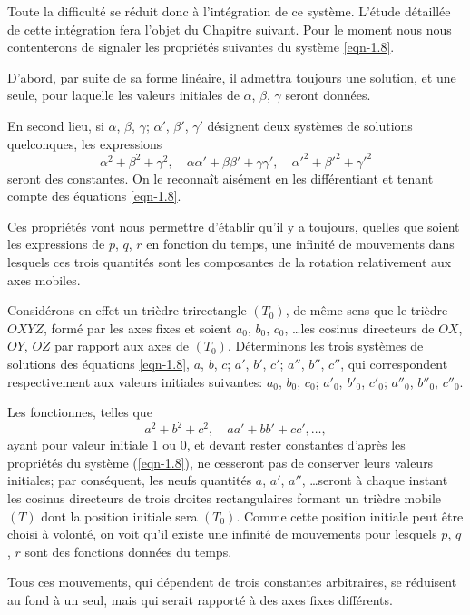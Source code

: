 Toute la difficulté se réduit donc à l'intégration de ce système. L'étude détaillée de cette intégration fera l'objet 
du Chapitre suivant. Pour le moment nous nous contenterons de signaler les propriétés suivantes du système 
\ref{eqn-1.8}.

D'abord, par suite de sa forme linéaire, il admettra toujours une solution, et une seule, pour laquelle les valeurs 
initiales de $\alpha$, $\beta$, $\gamma$ seront données.

En second lieu, si $\alpha$, $\beta$, $\gamma$; $\alpha'$, $\beta'$, $\gamma'$ désignent deux systèmes de solutions 
quelconques, les expressions
\[
	\alpha^2 + \beta^2 + \gamma^2,
	 \quad \alpha\alpha' + \beta\beta' + \gamma\gamma',
	 \quad \alpha'^2 + \beta'^2 + \gamma'^2
\]
seront des constantes. On le reconnaît aisément en les différentiant et tenant compte des équations \ref{eqn-1.8}.

Ces propriétés vont nous permettre d'établir qu'il y a toujours, quelles que soient	les expressions de $p$, $q$, $r$ en 
fonction du temps, une infinité de mouvements dans lesquels ces trois quantités sont les composantes de la rotation 
relativement aux axes mobiles.

Considérons en effet un trièdre trirectangle $(T_0)$, de même sens que le trièdre $OXYZ$, formé par les axes fixes et 
soient $a_0$, $b_0$, $c_0$, \ldots les cosinus directeurs de $OX$, $OY$, $OZ$ par rapport aux axes de $(T_0)$. 
Déterminons les trois systèmes de solutions des équations \ref{eqn-1.8}, $a$, $b$, $c$; $a'$, $b'$, $c'$; $a''$, $b''$, 
$c''$, qui correspondent respectivement aux valeurs initiales suivantes: $a_0$, $b_0$, $c_0$; $a'_0$, $b'_0$, $c'_0$; 
$a''_0$, $b''_0$, $c''_0$.

Les fonctionnes, telles que
\[
	a^2 + b^2 + c^2, \quad aa' + bb' + cc', \ldots,
\]
ayant pour valeur initiale 1 ou 0, et devant rester constantes d'après les propriétés du système (\ref{eqn-1.8}), ne 
cesseront pas de conserver leurs valeurs initiales; par conséquent, les neufs quantités $a$, $a'$, $a''$, \ldots seront 
à chaque instant les cosinus directeurs de trois droites rectangulaires formant un trièdre mobile $(T)$ dont la 
position initiale sera $(T_0)$. Comme cette position initiale peut être choisi à volonté, on voit qu'il existe une 
infinité de mouvements pour lesquels $p$, $q$, $r$ sont des fonctions données du temps.

Tous ces mouvements, qui dépendent de trois constantes arbitraires, se réduisent au fond à un seul, mais qui serait 
rapporté à des axes fixes différents.

